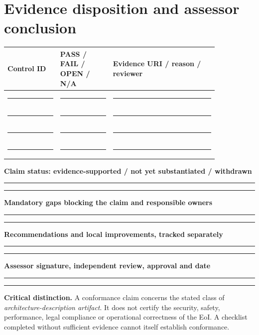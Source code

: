 \documentclass[11pt,letterpaper]{article}
\renewcommand{\Field}[2]{\par\noindent\textbf{#1}\par\nobreak\smallskip\noindent\textcolor{Muted}{\footnotesize #2}\par\smallskip\noindent\rule{\linewidth}{0.35pt}\vspace{8pt}}
\begin{document}
\section{Evidence disposition and assessor conclusion}
\begin{longtable}{p{0.21\linewidth}p{0.21\linewidth}p{0.42\linewidth}}\toprule\textbf{Control ID}&\textbf{PASS / FAIL / OPEN / N/A}&\textbf{Evidence URI / reason / reviewer}\\\midrule\endhead
{\rule{0.65\linewidth}{0.4pt}}&\rule{0.55\linewidth}{0.4pt}&\rule{0.65\linewidth}{0.4pt}\\
{\rule{0.65\linewidth}{0.4pt}}&\rule{0.55\linewidth}{0.4pt}&\rule{0.65\linewidth}{0.4pt}\\
{\rule{0.65\linewidth}{0.4pt}}&\rule{0.55\linewidth}{0.4pt}&\rule{0.65\linewidth}{0.4pt}\\
{\rule{0.65\linewidth}{0.4pt}}&\rule{0.55\linewidth}{0.4pt}&\rule{0.65\linewidth}{0.4pt}\\\bottomrule\end{longtable}
\Field{Claim status: evidence-supported / not yet substantiated / withdrawn}{\rule{0.65\linewidth}{0.4pt}}
\Field{Mandatory gaps blocking the claim and responsible owners}{\rule{0.65\linewidth}{0.4pt}}
\Field{Recommendations and local improvements, tracked separately}{\rule{0.65\linewidth}{0.4pt}}
\Field{Assessor signature, independent review, approval and date}{\rule{0.65\linewidth}{0.4pt}}
\begin{Requirement}\textbf{Critical distinction.} A conformance claim concerns the stated class of \emph{architecture-description artifact}. It does not certify the security, safety, performance, legal compliance or operational correctness of the EoI. A checklist completed without sufficient evidence cannot itself establish conformance. \end{Requirement}
\LegalFooter
\end{document}
